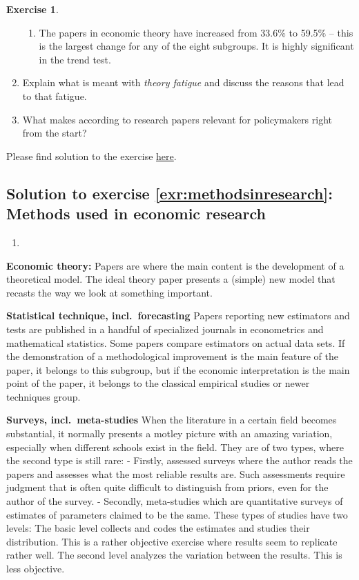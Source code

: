 \documentclass[
  12pt,
  oneside]{book}
\providecommand{\tightlist}{%
  \setlength{\itemsep}{0pt}\setlength{\parskip}{0pt}}
\theoremstyle{definition}
\theoremstyle{definition}
\theoremstyle{definition}
\newtheorem{exercise}{Exercise}[chapter]
\theoremstyle{definition}
\theoremstyle{remark}
\begin{document}
\begin{exercise}
\begin{enumerate}
\begin{enumerate}
  \item
    The papers in economic theory have increased from 33.6\% to 59.5\% -- this is the largest change for any of the eight subgroups. It is highly significant in the trend test.
  \end{enumerate}
\item
  Explain what is meant with \textit{theory fatigue} and discuss the reasons that lead to that fatigue.
\item
  What makes according to \cite{Paldam2021Methods} research papers relevant for policymakers right from the start?
\end{enumerate}

Please find solution to the exercise \protect\hyperlink{sol:methodsinresearch}{here}.
\end{exercise}

\hypertarget{sol:methodsinresearch}{%
\subsection*{Solution to exercise \ref{exr:methodsinresearch}: Methods used in economic research}\label{sol:methodsinresearch}}

\begin{enumerate}
\def\labelenumi{\alph{enumi})}
\tightlist
\item
\end{enumerate}

\textbf{Economic theory:} Papers are where the main content is the development of a theoretical model. The ideal theory paper presents a (simple) new model that recasts the way we look at something important.

\textbf{Statistical technique, incl.~forecasting} Papers reporting new estimators and tests are published in a handful of specialized journals in econometrics and mathematical statistics. Some papers compare estimators on actual data sets. If the demonstration of a methodological improvement is the main feature of the paper, it belongs to this subgroup, but if the economic interpretation is the main point of the paper, it belongs to the classical empirical studies or newer techniques group.

\textbf{Surveys, incl.~meta-studies} When the literature in a certain field becomes substantial, it normally presents a motley picture with an amazing variation, especially when different schools exist in the field. They are of two types, where the second type is still rare:
- Firstly, assessed surveys where the author reads the papers and assesses what the most reliable results are. Such assessments require judgment that is often quite difficult to distinguish from priors, even for the author of the survey.
- Secondly, meta-studies which are quantitative surveys of estimates of parameters claimed to be the same. These types of studies have two levels: The basic level collects and codes the estimates and studies their distribution. This is a rather objective exercise where results seem to replicate rather well. The second level analyzes the variation between the results. This is less objective.
\end{document}
